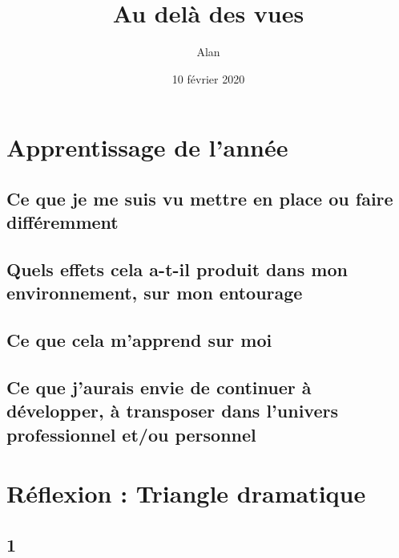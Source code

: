 \documentclass[12pt, a4paper,openany]{book}
\begin{document}
\title{Au delà des vues}
\author{Alan }
\date{10 février 2020}
\maketitle
\setcounter{tocdepth}{1}
\tableofcontents

	\chapter{Apprentissage de l'année}
	
		\section{Ce que je me suis vu mettre en place ou faire différemment}
		
		\section{Quels effets cela a-t-il produit dans mon environnement, sur mon entourage}
	
		\section{Ce que cela m'apprend sur moi}
		
		\section{Ce que j'aurais envie de continuer à développer, à transposer dans l'univers professionnel et/ou personnel}
	
	\chapter{Réflexion : Triangle dramatique}
	
		\section{1}
\end{document}

